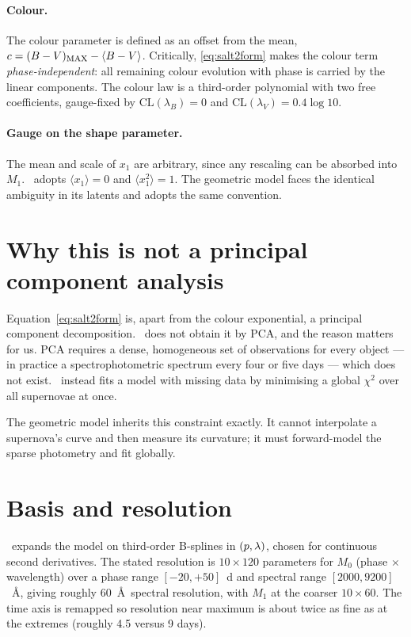 \documentclass[11pt]{article}
\begin{document}
\paragraph{Colour.} The colour parameter is defined as an offset from the mean,
$c = (B-V)_{\mathrm{MAX}} - \langle B-V\rangle$. Critically,
\eqref{eq:salt2form} makes the colour term \emph{phase-independent}: all
remaining colour evolution with phase is carried by the linear components. The
colour law is a third-order polynomial with two free coefficients, gauge-fixed
by $\mathrm{CL}(\lambda_{B}) = 0$ and
$\mathrm{CL}(\lambda_{V}) = 0.4\log 10$.

\paragraph{Gauge on the shape parameter.} The mean and scale of $x_{1}$ are
arbitrary, since any rescaling can be absorbed into $M_{1}$. \salt\ adopts
$\langle x_{1}\rangle = 0$ and $\langle x_{1}^{2}\rangle = 1$. The geometric
model faces the identical ambiguity in its latents and adopts the same
convention.

\section{Why this is not a principal component analysis}

Equation~\eqref{eq:salt2form} is, apart from the colour exponential, a
principal component decomposition. \salt\ does not obtain it by PCA, and the
reason matters for us. PCA requires a dense, homogeneous set of observations
for every object --- in practice a spectrophotometric spectrum every four or
five days --- which does not exist. \salt\ instead fits a model with missing
data by minimising a global $\chi^{2}$ over all supernovae at once.

The geometric model inherits this constraint exactly. It cannot interpolate a
supernova's curve and then measure its curvature; it must forward-model the
sparse photometry and fit globally.

\section{Basis and resolution}

\salt\ expands the model on third-order B-splines in $(p,\lambda)$, chosen
for continuous second derivatives. The stated resolution is $10\times120$
parameters for $M_{0}$ (phase $\times$ wavelength) over a phase range
$[-20,+50]$~d and spectral range $[2000,9200]$~\AA, giving roughly 60~\AA\
spectral resolution, with $M_{1}$ at the coarser $10\times60$. The time axis is
remapped so resolution near maximum is about twice as fine as at the extremes
(roughly 4.5 versus 9 days).
\end{document}
